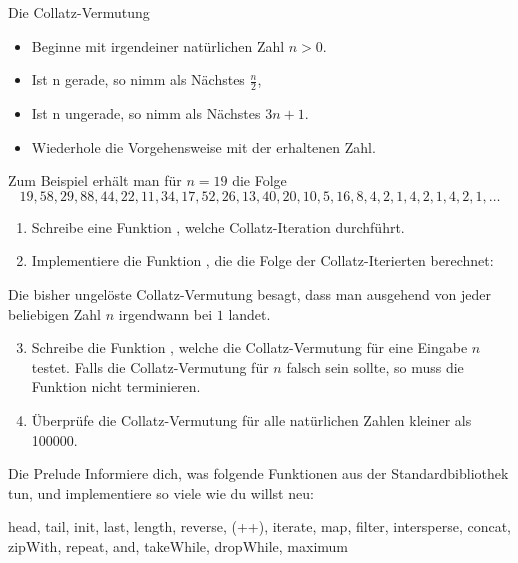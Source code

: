 \documentclass{uebblatt}
\begin{document}
\begin{aufgabe}{Die Collatz-Vermutung}
  \begin{itemize}
    \item Beginne mit irgendeiner natürlichen Zahl $n > 0$.
    \item Ist n gerade, so nimm als Nächstes $\tfrac{n}{2}$,
    \item Ist n ungerade, so nimm als Nächstes $3n + 1$.
    \item Wiederhole die Vorgehensweise mit der erhaltenen Zahl.
  \end{itemize}
  Zum Beispiel erhält man für $n=19$ die Folge
  \[ 19, 58, 29, 88, 44, 22, 11, 34, 17, 52, 26, 13, 40, 20, 10, 5, 16, 8, 4, 2, 1, 4, 2, 1, 4, 2, 1, \ldots \]
  \begin{enumerate}
    
    \item Schreibe eine Funktion , welche Collatz-Iteration durchführt.
    \item Implementiere die Funktion , die die Folge der Collatz-Iterierten berechnet: 
  \end{enumerate}
  Die bisher ungelöste Collatz-Vermutung besagt, dass man ausgehend von jeder beliebigen Zahl $n$ irgendwann bei $1$ landet.
  \begin{enumerate}
    \setcounter{enumi}{2}
    \item Schreibe die Funktion , welche die Collatz-Vermutung für eine Eingabe $n$ testet. Falls die Collatz-Vermutung für $n$ falsch sein sollte, so muss die Funktion nicht terminieren.
    \item Überprüfe die Collatz-Vermutung für alle natürlichen Zahlen kleiner als 100000.
  \end{enumerate}
\end{aufgabe}

\begin{aufgabe}{Die Prelude}
  Informiere dich, was folgende Funktionen aus der Standardbibliothek tun, und implementiere so viele wie du willst neu:
  \begin{haskellcode}
head, tail, init, last, length, reverse, (++), iterate, map, filter,
intersperse, concat, zipWith, repeat, and, takeWhile, dropWhile, maximum
  \end{haskellcode}
\end{aufgabe}
\end{document}
